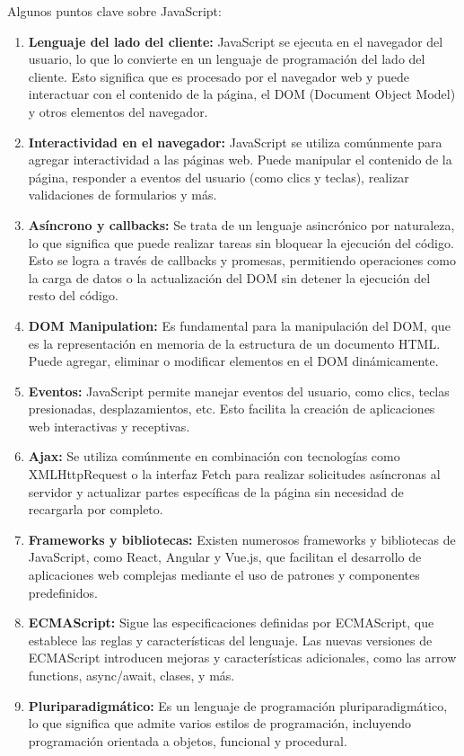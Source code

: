 \documentclass[a4paper, 12pt]{book}
\begin{document}
Algunos puntos clave sobre JavaScript:

\begin{enumerate}
  \item \textbf{Lenguaje del lado del cliente:} JavaScript se ejecuta en el navegador del usuario, lo que lo convierte en un lenguaje de programación del lado del cliente. 
  Esto significa que es procesado por el navegador web y puede interactuar con el contenido de la página, el DOM (Document Object Model) y otros elementos del navegador.
  \item \textbf{Interactividad en el navegador:} JavaScript se utiliza comúnmente para agregar interactividad a las páginas web. Puede manipular el contenido de la página, 
  responder a eventos del usuario (como clics y teclas), realizar validaciones de formularios y más.
  \item \textbf{Asíncrono y callbacks:} Se trata de un lenguaje asincrónico por naturaleza, lo que significa que puede realizar tareas sin bloquear la ejecución del código. 
  Esto se logra a través de callbacks y promesas, permitiendo operaciones como la carga de datos o la actualización del DOM sin detener la ejecución del resto del código.
  \item \textbf{DOM Manipulation:} Es fundamental para la manipulación del DOM, que es la representación en memoria de la estructura de un documento HTML. 
  Puede agregar, eliminar o modificar elementos en el DOM dinámicamente.
  \item \textbf{Eventos:} JavaScript permite manejar eventos del usuario, como clics, teclas presionadas, desplazamientos, etc. Esto facilita la creación de aplicaciones 
  web interactivas y receptivas.
  \item \textbf{Ajax:} Se utiliza comúnmente en combinación con tecnologías como XMLHttpRequest o la interfaz Fetch para realizar solicitudes asíncronas al servidor y actualizar partes específicas de la página sin necesidad de recargarla por completo.
  \item \textbf{Frameworks y bibliotecas:} Existen numerosos frameworks y bibliotecas de JavaScript, como React, Angular y Vue.js, que facilitan el desarrollo de aplicaciones web complejas 
  mediante el uso de patrones y componentes predefinidos.
  \item \textbf{ECMAScript:} Sigue las especificaciones definidas por ECMAScript, que establece las reglas y características del lenguaje. Las nuevas versiones de ECMAScript introducen mejoras 
  y características adicionales, como las arrow functions, async/await, clases, y más.
  \item \textbf{Pluriparadigmático:} Es un lenguaje de programación pluriparadigmático, lo que significa que admite varios estilos de programación, incluyendo programación orientada a objetos, funcional y procedural.
\end{enumerate}
\end{document}
